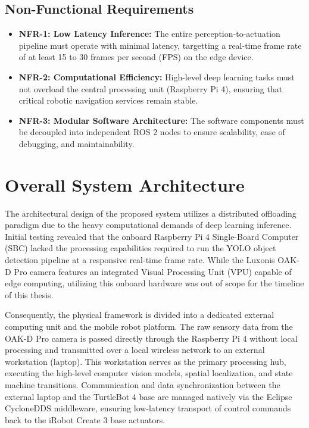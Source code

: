 \subsection{Non-Functional Requirements}
\begin{itemize}
	\item \textbf{NFR-1: Low Latency Inference:} The entire perception-to-actuation pipeline must operate with minimal latency, targetting a real-time frame rate of at least 15 to 30 frames per second (FPS) on the edge device.
	\item \textbf{NFR-2: Computational Efficiency:} High-level deep learning tasks must not overload the central processing unit (Raspberry Pi 4), ensuring that critical robotic navigation services remain stable.
	\item \textbf{NFR-3: Modular Software Architecture:} The software components must be decoupled into independent ROS 2 nodes to ensure scalability, ease of debugging, and maintainability.
\end{itemize}

\section{Overall System Architecture}
The architectural design of the proposed system utilizes a distributed offloading paradigm due to the heavy computational demands of deep learning inference. Initial testing revealed that the onboard Raspberry Pi 4 Single-Board Computer (SBC) lacked the processing capabilities required to run the YOLO object detection pipeline at a responsive real-time frame rate. While the Luxonis OAK-D Pro camera features an integrated Visual Processing Unit (VPU) capable of edge computing, utilizing this onboard hardware was out of scope for the timeline of this thesis. 

Consequently, the physical framework is divided into a dedicated external computing unit and the mobile robot platform. The raw sensory data from the OAK-D Pro camera is passed directly through the Raspberry Pi 4 without local processing and transmitted over a local wireless network to an external workstation (laptop). This workstation serves as the primary processing hub, executing the high-level computer vision models, spatial localization, and state machine transitions. Communication and data synchronization between the external laptop and the TurtleBot 4 base are managed natively via the Eclipse CycloneDDS middleware, ensuring low-latency transport of control commands back to the iRobot Create 3 base actuators.


